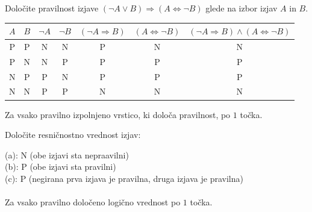 \documentclass[addpoints]{exam}
\begin{document}
\begin{questions}

    
    \question[4]
    Določite pravilnost izjave $(\lnot A \lor  B)\Rightarrow (A\Leftrightarrow \lnot B)$ glede na izbor izjav $A$ in $B$.

    \begin{solution}[11cm]
        \begin{table}[H]
            \begin{tabular}{ccccccc}
             $A$ & $B$ & $\lnot A$ & $\lnot B$ & $(\lnot A\Rightarrow B)$ & $(A\Leftrightarrow \lnot B)$ & $(\lnot A\Rightarrow B)\land(A\Leftrightarrow \lnot B)$\\ \hline
             P & P & N & N & P & N & N \\ 
             P & N & N & P & P & P & P \\
             N & P & P & N & P & P & P \\
             N & N & P & P & N & N & N
            \end{tabular}
        \end{table}
        Za vsako pravilno izpolnjeno vrstico, ki določa pravilnost, po $1$ točka.
    \end{solution}




    \question[3]
    Določite resničnostno vrednost izjav:

    \begin{solution}
        (a): N (obe izjavi sta nepraavilni) \\
        (b): P (obe izjavi sta pravilni) \\
        (c): P (negirana prva izjava je pravilna, druga izjava je pravilna) \\ \\
        Za vsako pravilno določeno logično vrednost po $1$ točka.
    \end{solution}




\end{questions}
\end{document}
